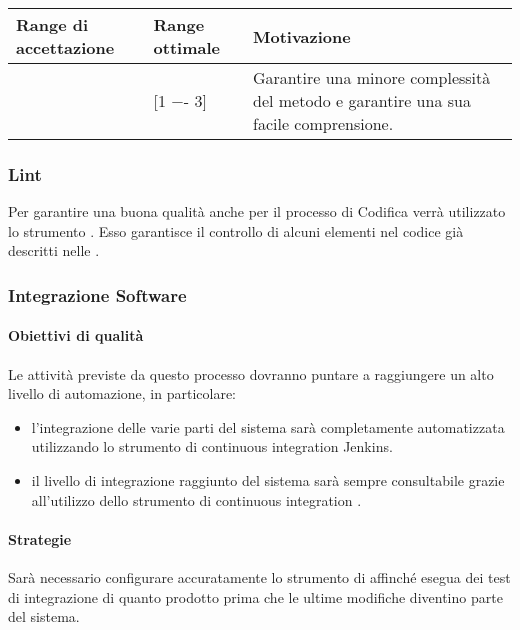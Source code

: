 \begin{center}
		\begin{tabular}{|P{2.5cm}|P{2.5cm}|P{6cm}|}
		\hline
			\textbf{Range di accettazione}	& \textbf{Range ottimale} & \textbf{Motivazione} \\
			\hline
			[1 -- 5] & [1 −- 3] &	Garantire una minore complessità del metodo e garantire una sua facile comprensione. \\
			\hline
			\end{tabular}
\end{center}


\subsubsection{Lint}

Per garantire una buona qualità anche per il processo di Codifica verrà utilizzato lo strumento . Esso garantisce il controllo di alcuni elementi nel codice già descritti nelle \NdP.



\subsubsection{Integrazione Software}

\paragraph{Obiettivi di qualità}
Le attività previste da questo processo dovranno puntare a raggiungere un alto livello di automazione, in particolare:
\begin{itemize}
\item l'integrazione delle varie parti del sistema sarà completamente automatizzata utilizzando lo strumento di continuous integration Jenkins.
\item il livello di integrazione raggiunto del sistema sarà sempre consultabile grazie all'utilizzo dello strumento di continuous integration .
\end{itemize}

\paragraph{Strategie}
Sarà necessario configurare accuratamente lo strumento di   affinché esegua dei test di integrazione di quanto prodotto prima che le ultime modifiche diventino parte del sistema.

